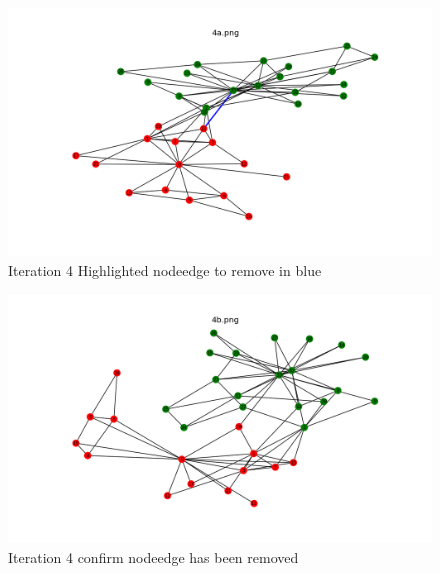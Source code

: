 \documentclass[12pt]{article}
\begin{document}
\begin{figure}[H]
\centering
\includegraphics[trim=0 0 0 0, clip, width=\textwidth] {4a.png}
\caption{Iteration 4 Highlighted nodeedge to remove in blue }
\label{fig:q14a}
\end{figure}
\begin{figure}[H]
\centering
\includegraphics[trim=0 0 0 0, clip, width=\textwidth] {4b.png}
\caption{Iteration 4 confirm nodeedge has been removed }
\label{fig:q14b}
\end{figure}
\end{document}

